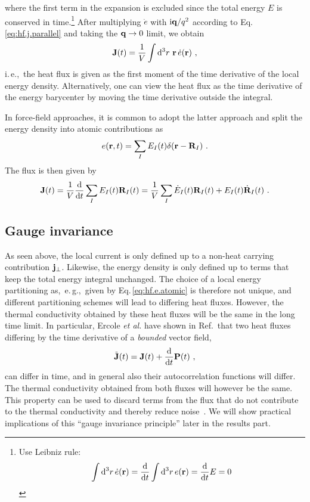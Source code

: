 where the first term in the expansion is excluded since the total energy $E$ is conserved in time.\footnote{Use Leibniz rule:
\begin{align*}
	\int {\rm d}^3 r \, \dot{e} ({\bf r}) = \frac{{\rm d}}{{\rm d} t} \int {\rm d}^3 r \, e ({\bf r}) = \frac{{\rm d}}{{\rm d} t} E = 0
\end{align*}
}
After multiplying $\dot e$ with ${\rm i} {\bf q} / q^2$ according to Eq.\,\eqref{eq:hf.j.parallel} and taking the ${\bf q} \to 0$ limit, we obtain
\begin{align}
	\b J (t) 
		= \frac{1}{V} \int \d^3 r ~ \b r \, \dot{e} (\b r)
	~,
	\label{eq:hf.J}
\end{align}
i.\,e.,~the heat flux is given as the first moment of the time derivative of the local energy density. Alternatively, one can view the heat flux as the time derivative of the energy barycenter by moving the time derivative outside the integral.

In force-field approaches, it is common to adopt the latter approach and split the energy density into atomic contributions as
\begin{align}
	e (\b r, t ) = \sum_I E_I (t) \delta (\b r - \b R_I)~.
	\label{eq:hf.e.atomic}
\end{align}
The flux is then given by
\begin{align}
	\b J (t) 
		= \frac{1}{V} \frac{\d}{\d t} \sum_I E_I(t) \b R_I(t)
		= \frac{1}{V} \sum_I \dot{E}_I (t) \b R_I (t) + E_I (t) \dot{\b R}_I (t)~.
	\label{eq:hf.J.atomic}
\end{align}

\subsection{Gauge invariance}
As seen above, the local current is only defined up to a non-heat carrying contribution ${\bf j}_{\perp}$. Likewise, the energy density is only defined up to terms that keep the total energy integral unchanged. The choice of a local energy partitioning as,~e.\,g.,~given by Eq.\,\eqref{eq:hf.e.atomic} is therefore not unique, and different partitioning schemes will lead to differing heat fluxes. However, the thermal conductivity obtained by these heat fluxes will be the same in the long time limit. In particular, Ercole \emph{et al.} have shown in Ref.\,\cite{Ercole2016} that two heat fluxes differing by the time derivative of a \emph{bounded} vector field,
\begin{align}
  \tilde{{\bf J}} (t) = {\bf J} (t) + \frac{{\rm d}}{{\rm d} t} {\bf P} (t)~,
\end{align}
can differ in time, and in general also their autocorrelation functions will differ. The thermal conductivity obtained from both fluxes will however be the same. This property can be used to discard terms from the flux that do not contribute to the thermal conductivity and thereby reduce noise~. We will show practical implications of this ``gauge invariance principle'' later in the results part.

